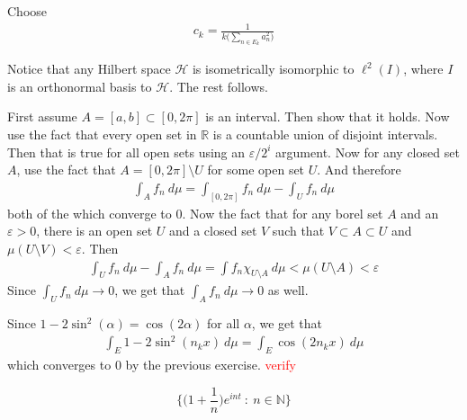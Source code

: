 \begin{solution}
  Choose
  \begin{align*}
    c_k = \frac{1}{k \big(\sum_{n \in E_k} a_n^2\big)}
  \end{align*}
\end{solution}

\begin{solution}
  Notice that any Hilbert space $\mathcal{H}$ is isometrically
  isomorphic to $\ell^{2}(I)$, where $I$ is an orthonormal basis to
  $\mathcal{H}$. The rest follows.
\end{solution}

\begin{solution}
  First assume $A = [a, b] \subset [0, 2\pi]$ is an interval. Then
  show that it holds. Now use the fact that every open set in
  $\mathbb{R}$ is a countable union of disjoint intervals. Then that
  is true for all open sets using an $\varepsilon/2^i$ argument. Now
  for any closed set $A$, use the fact
  that $A = [0, 2\pi] \setminus U$ for some open set $U$. And therefore
  \begin{align*}
    \int_A  f_n \ d \mu = \int_{[0, 2\pi]}  f_n \ d \mu - \int_U  f_n \ d \mu
  \end{align*}
  both of the which converge to $0$. Now the fact that for any borel
  set $A$ and an $ \varepsilon > 0$, there is an open set $U$ and a
  closed set $V$ such that $V \subset A \subset U$ and $\mu(U
  \setminus V) < \varepsilon$. Then
  \begin{align*}
    \int_U  f_n \ d \mu - \int_A  f_n \ d \mu = \int f_n \chi_{U
    \setminus A} \ d \mu < \mu(U \setminus A) < \varepsilon
  \end{align*}
  Since $\int_U f_n \ d \mu \to 0$, we get that $\int_A  f_n \ d \mu
  \to 0$ as well.
\end{solution}

\begin{solution}
  Since $1 - 2\sin^2(\alpha) = \cos(2\alpha)$ for all $\alpha$, we get that
  \begin{align*}
    \int_E 1 -  2\sin^2(n_k x) \ d \mu = \int_E \cos(2n_k x) \ d \mu
  \end{align*}
  which converges to $0$ by the previous exercise. \textcolor{red}{verify}
\end{solution}

\begin{solution}
  $$\Bigg \{ \Big(1 + \frac{1}{n}\Big)e^{int}  \ : \  n \in
  \mathbb{N}\Bigg \}$$
\end{solution}

